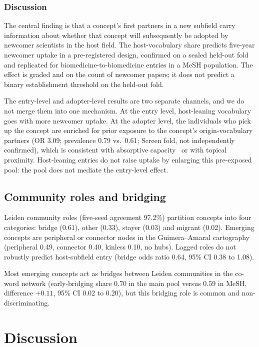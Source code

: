 \documentclass[11pt,letterpaper]{article}
\begin{document}
\subsubsection{Discussion}
\label{sec:rq2_discussion}

The central finding is that a concept's first partners in a new subfield carry information about whether that
concept will subsequently be adopted by newcomer scientists in the host field. The host-vocabulary share
predicts five-year newcomer uptake in a pre-registered design, confirmed on a sealed held-out fold and
replicated for biomedicine-to-biomedicine entries in a MeSH population. The effect is graded and on the count
of newcomer papers; it does not predict a binary establishment threshold on the held-out fold.

The entry-level and adopter-level results are two separate channels, and we do not merge them into one
mechanism. At the entry level, host-leaning vocabulary goes with more newcomer uptake. At the adopter level, the
individuals who pick up the concept are enriched for prior exposure to the concept's origin-vocabulary partners
(OR 3.09; prevalence 0.79 vs.\ 0.61; Screen fold, not independently confirmed), which is consistent with
absorptive capacity~\citep{Cohen1990} or with topical proximity. Host-leaning entries do not raise uptake by
enlarging this pre-exposed pool: the pool does not mediate the entry-level effect.

\subsection{Community roles and bridging}
\label{sec:community}

Leiden community roles (five-seed agreement 97.2\%) partition concepts into four categories: bridge (0.61),
other (0.33), stayer (0.03) and migrant (0.02). Emerging concepts are peripheral or connector nodes in the
Guimera--Amaral cartography~\citep{Guimera2005a} (peripheral 0.49, connector 0.40, kinless 0.10, no hubs).
Lagged roles do not robustly predict host-subfield entry (bridge odds ratio 0.64, 95\% CI 0.38 to 1.08).

Most emerging concepts act as bridges between Leiden communities in the co-word network (early-bridging share
0.70 in the main pool versus 0.59 in MeSH, difference $+0.11$, 95\% CI 0.02 to 0.20), but this bridging role
is common and non-discriminating.

\section{Discussion}
\label{sec:discussion}
\end{document}

